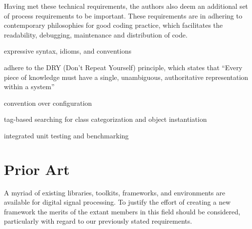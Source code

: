 \documentclass[twoside,10pt]{article}
\newenvironment{packed_item}{
\begin{itemize}
  \setlength{\itemsep}{1pt}
  \setlength{\parskip}{0pt}
  \setlength{\parsep}{0pt}
}{\end{itemize}}
\begin{document}
\noindent Having met these technical requirements, the authors also deem an additional set of process requirements to be important.  These requirements are in adhering to contemporary philosophies for good coding practice, 
which facilitates the readability, debugging, maintenance and distribution of code. 

\begin{packed_item}%
	\item expressive syntax, idioms, and conventions
	\item adhere to the DRY (Don't Repeat Yourself) principle, which states that ``Every piece of knowledge must have a single, unambiguous, authoritative representation within a system''\cite{Hunt:1999}
	\item convention over configuration\cite{web1}
	\item tag-based searching for class categorization and object instantiation
	\item integrated unit testing and benchmarking\cite{web2}
\end{packed_item}%





\section{Prior Art} %
\label{sec:prior_art}

A myriad of existing libraries, toolkits, frameworks, and environments are available for digital signal processing.  To justify the effort of creating a new framework the merits of the extant members in this field should be considered, particularly with regard to our previously stated requirements.

\end{document}
